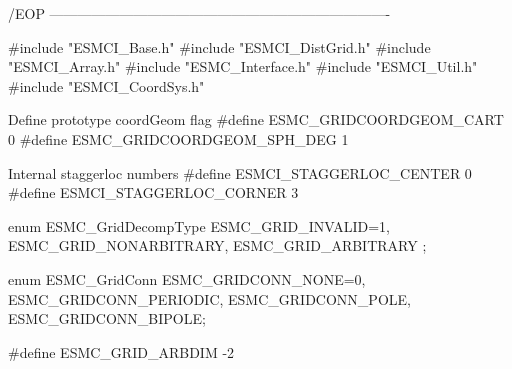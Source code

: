   /EOP
  -------------------------------------------------------------------------
 
 #include "ESMCI_Base.h"
 #include "ESMCI_DistGrid.h"
 #include "ESMCI_Array.h"
 #include "ESMC_Interface.h"
 #include "ESMCI_Util.h"
 #include "ESMCI_CoordSys.h"
 
   Define prototype coordGeom flag
 #define ESMC_GRIDCOORDGEOM_CART 0
 #define ESMC_GRIDCOORDGEOM_SPH_DEG 1
 
   Internal staggerloc numbers
 #define ESMCI_STAGGERLOC_CENTER 0
 #define ESMCI_STAGGERLOC_CORNER 3
 
 
 enum ESMC_GridDecompType {ESMC_GRID_INVALID=1, 
             ESMC_GRID_NONARBITRARY,
             ESMC_GRID_ARBITRARY
  };
 
 enum  ESMC_GridConn {ESMC_GRIDCONN_NONE=0,
                      ESMC_GRIDCONN_PERIODIC,
                      ESMC_GRIDCONN_POLE,
                      ESMC_GRIDCONN_BIPOLE};
 
 #define ESMC_GRID_ARBDIM  -2
 
